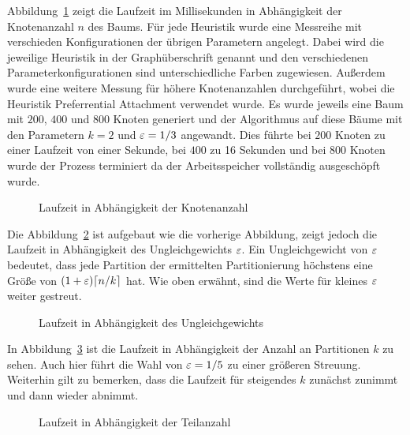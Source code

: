 Abbildung~\ref{fig:runnodes} zeigt die Laufzeit im Millisekunden in Abhängigkeit der Knotenanzahl $n$ des Baums.
Für jede Heuristik wurde eine Messreihe mit verschieden Konfigurationen der übrigen Parametern angelegt.
Dabei wird die jeweilige Heuristik in der Graphüberschrift genannt und den verschiedenen Parameterkonfigurationen sind unterschiedliche Farben zugewiesen. 
 Außerdem wurde eine weitere Messung für höhere Knotenanzahlen durchgeführt, wobei die Heuristik Preferrential Attachment verwendet wurde.
Es wurde jeweils eine Baum mit $200$, $400$ und $800$ Knoten generiert und der Algorithmus auf diese Bäume mit den Parametern $k = 2$ und $\varepsilon = 1/3$ angewandt.
Dies führte bei $200$ Knoten zu einer Laufzeit von einer Sekunde, bei $400$ zu 16 Sekunden und bei $800$ Knoten wurde der Prozess terminiert da der Arbeitsspeicher vollständig ausgeschöpft wurde.
\begin{figure}[t]
    \centering
    \resizebox{\linewidth}{!}{}
    \caption{Laufzeit in Abhängigkeit der Knotenanzahl\label{fig:runnodes}}
\end{figure}

Die Abbildung~\ref{fig:runimb} ist aufgebaut wie die vorherige Abbildung, zeigt jedoch die Laufzeit in Abhängigkeit des Ungleichgewichts $\varepsilon$.
Ein Ungleichgewicht von $\varepsilon$ bedeutet, dass jede Partition der ermittelten Partitionierung höchstens eine Größe von $(1 + \varepsilon) \lceil n/k\rceil$ hat.
Wie oben erwähnt, sind die Werte für kleines $\varepsilon$ weiter gestreut.
\begin{figure}[t]
    \centering
    \resizebox{\linewidth}{!}{}
    \caption{Laufzeit in Abhängigkeit des Ungleichgewichts\label{fig:runimb}}
\end{figure}

In Abbildung~\ref{fig:runkparts} ist die Laufzeit in Abhängigkeit der Anzahl an Partitionen $k$ zu sehen.
Auch hier führt die Wahl von $\varepsilon=1/5$ zu einer größeren Streuung.
Weiterhin gilt zu bemerken, dass die Laufzeit für steigendes $k$ zunächst zunimmt und dann wieder abnimmt.
\begin{figure}
    \centering
    
    \caption{Laufzeit in Abhängigkeit der Teilanzahl\label{fig:runkparts}}
\end{figure}

